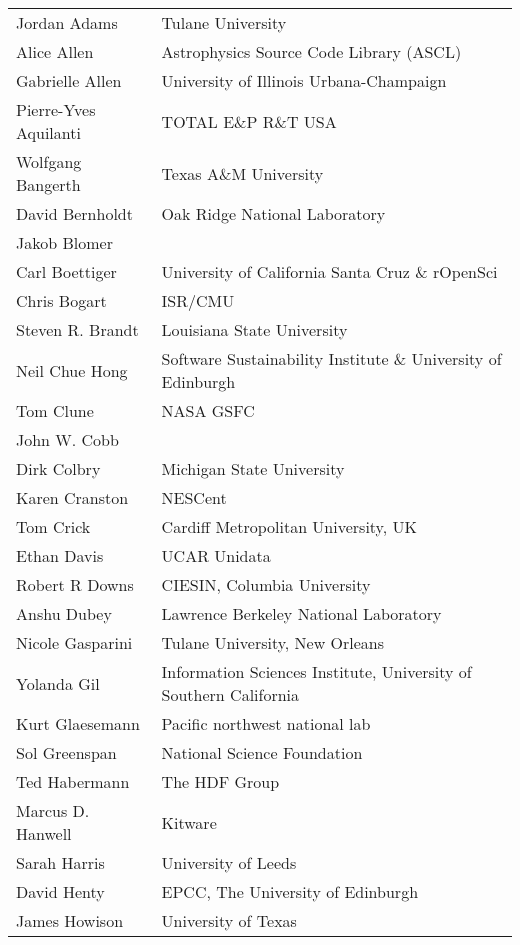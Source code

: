 \documentclass[11pt, oneside]{amsart}
\begin{document}
{\small
\begin{longtable}{ll}
   Jordan Adams          &  Tulane University
\\ Alice Allen           &  Astrophysics Source Code Library (ASCL)
\\ Gabrielle Allen       & University of Illinois Urbana-Champaign
\\ Pierre-Yves Aquilanti &  TOTAL E\&P R\&T USA
\\ Wolfgang Bangerth & Texas A\&M University
\\ David Bernholdt       &  Oak Ridge National Laboratory
\\ Jakob Blomer
\\ Carl Boettiger        &  University of California Santa Cruz \& rOpenSci
\\ Chris Bogart          &  ISR/CMU
\\ Steven R. Brandt      &  Louisiana State University
\\ Neil Chue Hong        &  Software Sustainability Institute \& University of Edinburgh
\\ Tom Clune             &  NASA GSFC
\\ John W. Cobb
\\ Dirk Colbry           &  Michigan State University
\\ Karen Cranston        &  NESCent
\\ Tom Crick             &  Cardiff Metropolitan University, UK
\\ Ethan Davis           &  UCAR Unidata
\\ Robert R Downs        &  CIESIN, Columbia University
\\ Anshu Dubey           &  Lawrence Berkeley National Laboratory
\\ Nicole Gasparini      &  Tulane University, New Orleans
\\ Yolanda Gil           &  Information Sciences Institute, University of Southern California
\\ Kurt Glaesemann       &  Pacific northwest national lab
\\ Sol Greenspan         &  National Science Foundation
\\ Ted Habermann         &  The HDF Group
\\ Marcus D. Hanwell     &  Kitware
\\ Sarah Harris          &  University of Leeds
\\ David Henty           &  EPCC, The University of Edinburgh
\\ James Howison         &  University of Texas

\end{longtable}}
\end{document}
